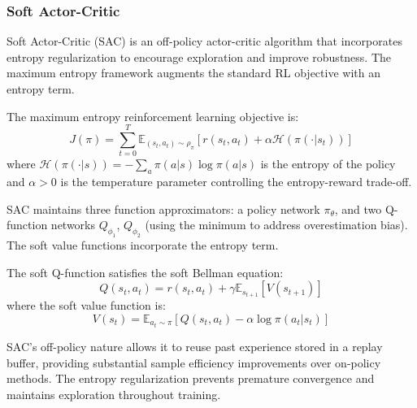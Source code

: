 \subsubsection{Soft Actor-Critic}

Soft Actor-Critic (SAC) is an off-policy actor-critic algorithm that incorporates entropy regularization to encourage exploration and improve robustness. The maximum entropy framework augments the standard RL objective with an entropy term.

\begin{definition}
\label{def:max_entropy}
The maximum entropy reinforcement learning objective is:
\begin{equation}
J(\pi) = \sum_{t=0}^{T} \mathbb{E}_{(s_t, a_t) \sim \rho_\pi}\left[r(s_t, a_t) + \alpha \mathcal{H}(\pi(\cdot|s_t))\right]
\end{equation}
where $\mathcal{H}(\pi(\cdot|s)) = -\sum_a \pi(a|s) \log \pi(a|s)$ is the entropy of the policy and $\alpha > 0$ is the temperature parameter controlling the entropy-reward trade-off.
\end{definition}

SAC maintains three function approximators: a policy network $\pi_\theta$, and two Q-function networks $Q_{\phi_1}$, $Q_{\phi_2}$ (using the minimum to address overestimation bias). The soft value functions incorporate the entropy term.

\begin{definition}
\label{def:soft_bellman}
The soft Q-function satisfies the soft Bellman equation:
\begin{equation}
Q(s_t, a_t) = r(s_t, a_t) + \gamma \mathbb{E}_{s_{t+1}}\left[V(s_{t+1})\right]
\end{equation}
where the soft value function is:
\begin{equation}
V(s_t) = \mathbb{E}_{a_t \sim \pi}\left[Q(s_t, a_t) - \alpha \log \pi(a_t|s_t)\right]
\end{equation}
\end{definition}

SAC's off-policy nature allows it to reuse past experience stored in a replay buffer, providing substantial sample efficiency improvements over on-policy methods. The entropy regularization prevents premature convergence and maintains exploration throughout training.

